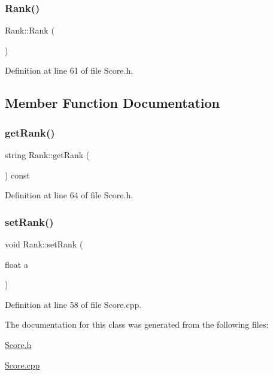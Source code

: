 \subsubsection{\texorpdfstring{Rank()}{Rank()}}
{\footnotesize\ttfamily Rank\+::\+Rank (\begin{DoxyParamCaption}{ }\end{DoxyParamCaption})\hspace{0.3cm}{\ttfamily [inline]}}



Definition at line 61 of file Score.\+h.



\subsection{Member Function Documentation}
\hypertarget{class_rank_ab51076f64f9ed558ab61f29283c630fc}{}\label{class_rank_ab51076f64f9ed558ab61f29283c630fc} 
\subsubsection{\texorpdfstring{get\+Rank()}{getRank()}}
{\footnotesize\ttfamily string Rank\+::get\+Rank (\begin{DoxyParamCaption}{ }\end{DoxyParamCaption}) const\hspace{0.3cm}{\ttfamily [inline]}}



Definition at line 64 of file Score.\+h.

\hypertarget{class_rank_ac844f437b5a6d913c649ae2f862db857}{}\label{class_rank_ac844f437b5a6d913c649ae2f862db857} 
\subsubsection{\texorpdfstring{set\+Rank()}{setRank()}}
{\footnotesize\ttfamily void Rank\+::set\+Rank (\begin{DoxyParamCaption}\item[{float}]{a }\end{DoxyParamCaption})}



Definition at line 58 of file Score.\+cpp.



The documentation for this class was generated from the following files\+:\begin{DoxyCompactItemize}
\item 
\hyperlink{_score_8h}{Score.\+h}\item 
\hyperlink{_score_8cpp}{Score.\+cpp}\end{DoxyCompactItemize}
